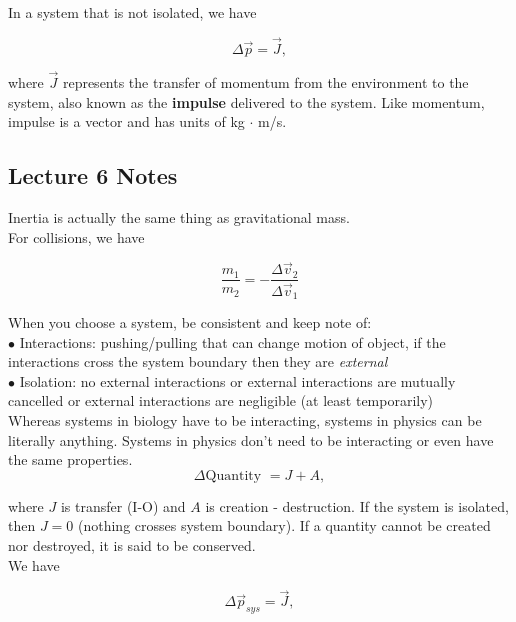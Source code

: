             In a system that is not isolated, we have

            \[
                \Delta \overrightarrow{p} = \overrightarrow{J},
            \]

            where $\overrightarrow{J}$ represents the transfer of momentum from the environment to the system, also known as the \textbf{impulse} delivered to the system. Like momentum, impulse is a vector and has units
            of kg $\cdot$ m/s.

        \subsection{Lecture 6 Notes}

            Inertia is actually the same thing as gravitational mass. \\

            For collisions, we have

            \[
                \frac{m_1}{m_2} = -\frac{\Delta \overrightarrow{v}_2}{\Delta \overrightarrow{v}_1}
            \]

            When you choose a system, be consistent and keep note of: \\
            $\bullet$ Interactions: pushing/pulling that can change motion of object, if the interactions cross the system boundary then they are \textit{external} \\
            $\bullet$ Isolation: no external interactions or external interactions are mutually cancelled or external interactions are negligible (at least temporarily) \\

            Whereas systems in biology have to be interacting, systems in physics can be literally anything. Systems in physics don't need to be interacting or even have the same properties. \\

            \[
                \Delta \text{Quantity } = J + A,
            \]

            where $J$ is transfer (I-O) and $A$ is creation - destruction. If the system is isolated, then $J=0$ (nothing crosses system boundary). If a quantity cannot be created nor destroyed, it is said to be
            conserved. \\

            We have

            \[
                \Delta \overrightarrow{p}_{sys}= \overrightarrow{J},
            \]

